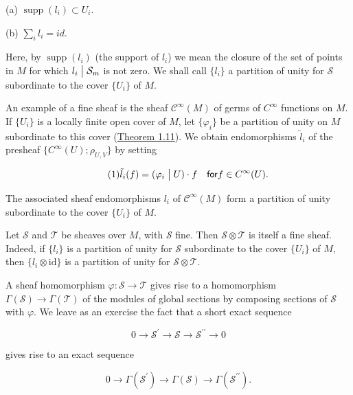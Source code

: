 (a) $\operatorname{supp}(l_i) \subset U_i$.

(b)  $ \sum_{i} l_{i} = id $.

Here, by $\operatorname{supp}(l_{i})$ (the support of $l_{i}$) we mean the closure of the set of points in $M$ for which $l_{i} \bigm| \mathcal{S}_{m}$ is not zero. We shall call $\{l_{i}\}$ a partition of unity for $\mathcal{S}$ subordinate to the cover $\{U_{i}\}$ of $M$.

An example of a fine sheaf is the sheaf  $ \mathcal{C}^{\infty}(M) $ of germs of  $ C^{\infty} $ functions on  $ M $. If  $ \{U_i\} $ is a locally finite open cover of  $ M $, let  $ \{\varphi_i\} $ be a partition of unity on  $ M $ subordinate to this cover (\hyperref[thm:1.11]{Theorem 1.11}). We obtain endomorphisms  $ \tilde{l}_i $ of the presheaf  $ \{C^{\infty}(U);\rho_{U,V}\} $ by setting

\begin{equation}
\tag{1}\label{eq:5.10:1}
\tilde{l}_{i}(f)=(\varphi_{i}\bigm|U)\cdot f\quad\mathsf{f o r}f\in C^{\infty}(U).
\end{equation}

The associated sheaf endomorphisms $l_{i}$ of $\mathcal{C}^{\infty}(M)$ form a partition of unity subordinate to the cover $\{U_{i}\}$ of $M$.

Let $\mathcal{S}$ and $\mathcal{T}$ be sheaves over $M$, with $\mathcal{S}$ fine. Then $\mathcal{S} \otimes \mathcal{T}$ is itself a fine sheaf. Indeed, if $\{l_i\}$ is a partition of unity for $\mathcal{S}$ subordinate to the cover $\{U_i\}$ of $M$, then $\{l_i \otimes \mathrm{id}\}$ is a partition of unity for $\mathcal{S} \otimes \mathcal{T}$.

\label{thm:5.11} A sheaf homomorphism $\varphi: \mathcal{S} \to \mathcal{T}$ gives rise to a homomorphism $\Gamma(\mathcal{S}) \to \Gamma(\mathcal{T})$ of the modules of global sections by composing sections of $\mathcal{S}$ with $\varphi$. We leave as an exercise the fact that a short exact sequence

\begin{equation}
\tag{1}\label{eq:5.11:1}
0\to\mathcal{S}^{\prime}\to\mathcal{S}\to\mathcal{S}^{\prime \prime}\to0
\end{equation}

gives rise to an exact sequence

\begin{equation}
\tag{2}\label{eq:5.11:2}
0\to\Gamma(\mathcal{S}^{\prime})\to\Gamma(\mathcal{S})\to\Gamma(\mathcal{S}^{\prime \prime}).
\end{equation}

